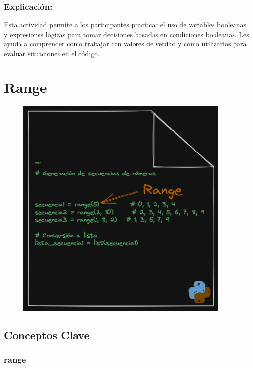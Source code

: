 \documentclass[
  a4paper,
  DIV=11,
  numbers=noendperiod,
  onepage,
  openany]{scrreprt}
\begin{document}
\subsection{Explicación:}\label{explicaciuxf3n-13}

Esta actividad permite a los participantes practicar el uso de variables
booleanas y expresiones lógicas para tomar decisiones basadas en
condiciones booleanas. Les ayuda a comprender cómo trabajar con valores
de verdad y cómo utilizarlos para evaluar situaciones en el código.

\chapter{Range}\label{range}

\begin{figure}

{\centering \includegraphics[width=4.16667in,height=\textheight]{unidades/unidad3/images/range.png}

}

\end{figure}

\section{Conceptos Clave}\label{conceptos-clave-11}

\subsection{range}\label{range-1}
\end{document}
